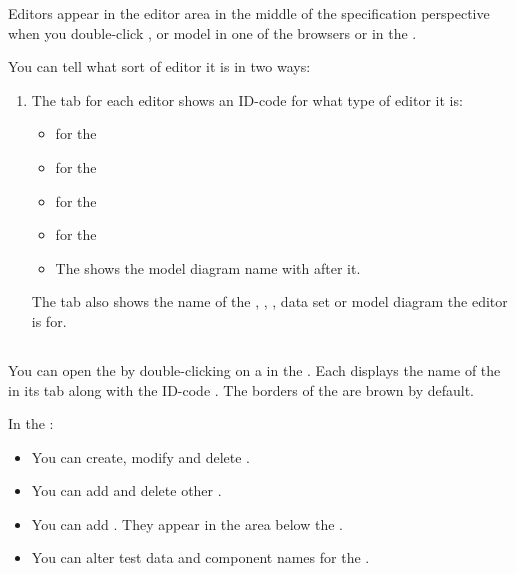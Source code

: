 Editors appear in the editor area in the middle of the specification perspective when you double-click \gdcase{}, \gdsuite{} or \gdcase{} model in one of the browsers or in the \gdnavview{}. 

You can tell what sort of editor it is in two ways:
\begin{enumerate}
\item The tab for each editor shows an ID-code for what type of editor it is:
\begin{itemize}
\item {} for the \gdtestcaseeditor{}
\item {} for the \gdtestsuiteeditor{}
\item {} for the \gdomeditor{}
\item {} for the \gddataeditor{}
\item The \gdmodeleditor shows the model diagram name with  after it.
\end{itemize}
The tab also shows the name of the \gdcase{}, \gdsuite{}, \gdaut{}, data set or model diagram the editor is for. 
\end{enumerate}
 
 

\subsection{\gdtestcaseeditor{}}
You can open the \gdtestcaseeditor{} by double-clicking on a \gdcase{} in the \gdtestcasebrowser{}. 
Each \gdtestcaseeditor{} displays the name of the \gdcase{} in its tab along with the ID-code . The borders of the \gdtestcaseeditor{} are brown by default. 
 
In the \gdtestcaseeditor{}:
\begin{itemize}
\item You can create, modify and delete \gdsteps{}. 
\item You can add and delete other \gdcases{}. 
\item You can add \gdehandlers{}. They appear in the \gdehandler area below the \gdtestcaseeditor{}.  
\item You can alter test data and component names for the \gdcase{}.
\end{itemize}

